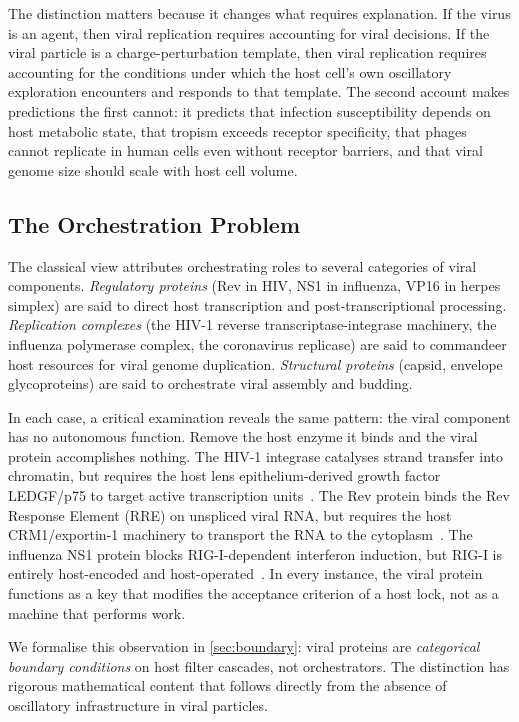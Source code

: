 \documentclass[12pt,a4paper]{article}
\theoremstyle{definition}
\theoremstyle{remark}
\begin{document}
The distinction matters because it changes what requires explanation. If the virus is an agent, then viral replication requires accounting for viral decisions. If the viral particle is a charge-perturbation template, then viral replication requires accounting for the conditions under which the host cell's own oscillatory exploration encounters and responds to that template. The second account makes predictions the first cannot: it predicts that infection susceptibility depends on host metabolic state, that tropism exceeds receptor specificity, that phages cannot replicate in human cells even without receptor barriers, and that viral genome size should scale with host cell volume.

\subsection{The Orchestration Problem}

The classical view attributes orchestrating roles to several categories of viral components. \textit{Regulatory proteins} (Rev in HIV, NS1 in influenza, VP16 in herpes simplex) are said to direct host transcription and post-transcriptional processing. \textit{Replication complexes} (the HIV-1 reverse transcriptase-integrase machinery, the influenza polymerase complex, the coronavirus replicase) are said to commandeer host resources for viral genome duplication. \textit{Structural proteins} (capsid, envelope glycoproteins) are said to orchestrate viral assembly and budding.

In each case, a critical examination reveals the same pattern: the viral component has no autonomous function. Remove the host enzyme it binds and the viral protein accomplishes nothing. The HIV-1 integrase catalyses strand transfer into chromatin, but requires the host lens epithelium-derived growth factor LEDGF/p75 to target active transcription units~\cite{Engelman2012}. The Rev protein binds the Rev Response Element (RRE) on unspliced viral RNA, but requires the host CRM1/exportin-1 machinery to transport the RNA to the cytoplasm~\cite{Malim1989}. The influenza NS1 protein blocks RIG-I-dependent interferon induction, but RIG-I is entirely host-encoded and host-operated~\cite{Gack2009}. In every instance, the viral protein functions as a key that modifies the acceptance criterion of a host lock, not as a machine that performs work.

We formalise this observation in \cref{sec:boundary}: viral proteins are \emph{categorical boundary conditions} on host filter cascades, not orchestrators. The distinction has rigorous mathematical content that follows directly from the absence of oscillatory infrastructure in viral particles.
\end{document}
